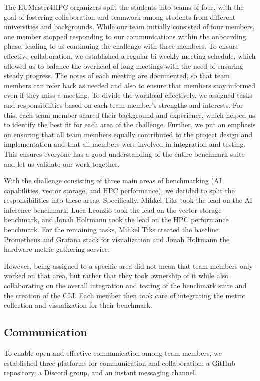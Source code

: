 \documentclass[conference,12pt]{IEEEtran}
\begin{document}
    The EUMaster4HPC organizers split the students into teams of four, with the goal of fostering collaboration and teamwork among students from different universities and backgrounds.
    While our team initially consisted of four members, one member stopped responding to our communications within the onboarding phase, leading to us continuing the challenge with three members.
    To ensure effective collaboration, we established a regular bi-weekly meeting schedule, which allowed us to balance the overhead of long meetings with the need of ensuring steady progress.
    The notes of each meeting are documented, so that team members can refer back as needed and also to ensure that members stay informed even if they miss a meeting.
    To divide the workload effectively, we assigned tasks and responsibilities based on each team member's strengths and interests.
    For this, each team member shared their background and experience, which helped us to identify the best fit for each area of the challenge.
    Further, we put an emphasis on ensuring that all team members equally contributed to the project design and implementation and that all members were involved in integration and testing.
    This ensures everyone has a good understanding of the entire benchmark suite and let us validate our work together.
    
    With the challenge consisting of three main areas of benchmarking (AI capabilities, vector storage, and HPC performance), we decided to split the responsibilities into these areas.
    Specifically, Mihkel Tiks took the lead on the AI inference benchmark, Luca Leonzio took the lead on the vector storage benchmark, and Jonah Holtmann took the lead on the HPC performance benchmark.
    For the remaining tasks, Mihkel Tiks created the baseline Prometheus and Grafana stack for visualization and Jonah Holtmann the hardware metric gathering service.
    
    However, being assigned to a specific area did not mean that team members only worked on that area, but rather that they took ownership of it while also collaborating on the overall integration and testing of the benchmark suite and the creation of the CLI.
    Each member then took care of integrating the metric collection and visualization for their benchmark.

    \subsection{Communication}
    To enable open and effective communication among team members, we established three platforms for communication and collaboration: a GitHub repository, a Discord group, and an instant messaging channel.
\end{document}
